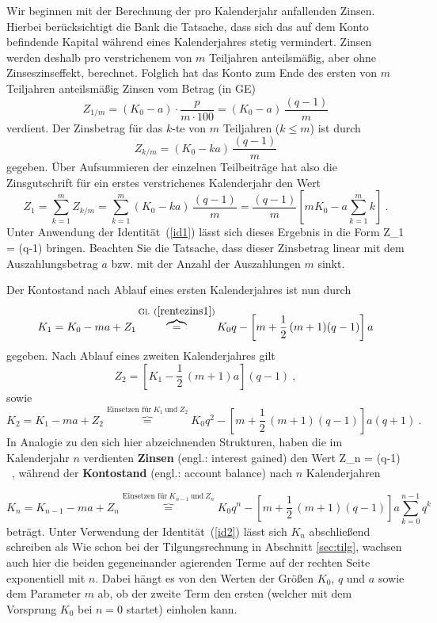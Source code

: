 \medskip
\noindent
Wir beginnen mit der Berechnung der pro Kalenderjahr anfallenden
Zinsen. Hierbei ber\"ucksichtigt die Bank die Tatsache, dass
sich das auf dem Konto befindende Kapital w\"ahrend eines
Kalenderjahres stetig vermindert. Zinsen werden deshalb
pro verstrichenem von $m$ Teiljahren anteilsm\"a\ss ig, aber ohne
Zinseszinseffekt, berechnet. Folglich hat das Konto zum Ende
des ersten von $m$ Teiljahren anteilsm\"a\ss ig Zinsen vom Betrag
(in GE)
%
\[
Z_{1/m} = (K_{0}-a)\cdot\frac{p}{m\cdot 100}
= (K_{0}-a)\,\frac{(q-1)}{m}
\]
%
verdient. Der Zinsbetrag f\"ur das $k$-te von $m$ Teiljahren
($k \leq m$) ist durch
%
\[
Z_{k/m} = (K_{0}-ka)\,\frac{(q-1)}{m}
\]
%
gegeben. \"Uber Aufsummieren der einzelnen Teilbeitr\"age
hat also die Zinsgutschrift f\"ur ein erstes verstrichenes
Kalenderjahr den Wert
%
\[
Z_{1} = \sum_{k=1}^{m}Z_{k/m}
= \sum_{k=1}^{m}(K_{0}-ka)\,\frac{(q-1)}{m}
= \frac{(q-1)}{m}\left[mK_{0}-a\sum_{k=1}^{m}k\right] \ .
\]
%
Unter Anwendung der Identit\"at~(\ref{id1}) l\"asst sich dieses
Ergebnis in die Form
%
\be
{}
Z_{1} = (q-1)
\ee
%
bringen. Beachten Sie die Tatsache, dass dieser Zinsbetrag linear
mit dem Auszahlungsbetrag $a$ bzw. mit der Anzahl der
Auszahlungen $m$ sinkt.

\medskip
\noindent
Der Kontostand nach Ablauf eines
ersten Kalenderjahres ist nun durch
%
\[
K_{1} = K_{0} - ma + Z_{1}
\overbrace{=}^{\text{Gl.}~(\ref{rentezins1})} K_{0}q
- \left[m+\frac{1}{2}\,(m+1)(q-1)\right]a
\]
%
gegeben. Nach Ablauf eines zweiten Kalenderjahres gilt
%
\[
Z_{2} = \left[K_{1}-\frac{1}{2}\,(m+1)a\right](q-1) \ ,
\]
%
sowie
%
\[
K_{2} = K_{1} - ma + Z_{2}
\overbrace{=}^{\text{Einsetzen f\"ur}\ K_{1}
\ \text{und}\ Z_{2}} K_{0}q^{2}
- \left[m+\frac{1}{2}\,(m+1)(q-1)\right]a(q+1) \ .
\]
%
In Analogie zu den sich hier abzeichnenden Strukturen,
haben die im Kalenderjahr $n$ verdienten {\bf Zinsen} (engl.: 
interest gained) den Wert
%
\be
Z_{n} = (q-1) \ ,
\ee
%
w\"ahrend der {\bf Kontostand} (engl.: account balance) nach $n$ 
Kalenderjahren

%
\[
K_{n} = K_{n-1} - ma + Z_{n}
\overbrace{=}^{\text{Einsetzen f\"ur}\ K_{n-1}
\ \text{und}\ Z_{n}} K_{0}q^{n}
- \left[m+\frac{1}{2}\,(m+1)(q-1)\right]a\sum_{k=0}^{n-1}q^{k}
\]
%
betr\"agt. Unter Verwendung der Identit\"at~(\ref{id2})
l\"asst sich $K_{n}$ abschlie\ss end schreiben als
%
\be
{}
\ee
%
Wie schon bei der Tilgungsrechnung in Abschnitt \ref{sec:tilg},
wachsen auch hier die beiden gegeneinander agierenden Terme
auf der rechten Seite %
exponentiell mit $n$. Dabei
h\"angt es von den Werten der Gr\"o\ss en $K_{0}$, $q$ und $a$
sowie dem Parameter $m$ ab, ob der zweite Term den ersten (welcher
mit dem Vorsprung $K_{0}$ bei $n=0$ startet) einholen kann.

